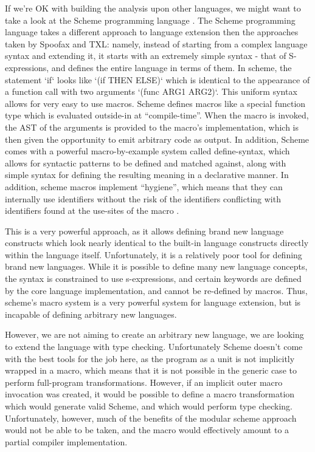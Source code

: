 If we’re OK with building the analysis upon other languages, we might want to
take a look at the Scheme programming language \cite{schemebook}. The Scheme
programming language takes a different approach to language extension then the
approaches taken by Spoofax and TXL: namely, instead of starting from a complex
language syntax and extending it, it starts with an extremely simple syntax -
that of S-expressions, and defines the entire language in terms of them. In
scheme, the statement `if` looks like `(if THEN ELSE)` which is identical to the
appearance of a function call with two arguments `(func ARG1 ARG2)`. This
uniform syntax allows for very easy to use macros. Scheme defines macros like a
special function type which is evaluated outside-in at “compile-time”. When the
macro is invoked, the AST of the arguments is provided to the macro’s
implementation, which is then given the opportunity to emit arbitrary code as
output. In addition, Scheme comes with a powerful macro-by-example system called
define-syntax, which allows for syntactic patterns to be defined and matched
against, along with simple syntax for defining the resulting meaning in a
declarative manner. In addition, scheme macros implement “hygiene”, which means
that they can internally use identifiers without the risk of the identifiers
conflicting with identifiers found at the use-sites of the
macro \cite{schemesyntaxpaper}.

This is a very powerful approach, as it allows defining brand new language
constructs which look nearly identical to the built-in language constructs
directly within the language itself. Unfortunately, it is a relatively poor tool
for defining brand new languages. While it is possible to define many new
language concepts, the syntax is constrained to use s-expressions, and certain
keywords are defined by the core language implementation, and cannot be
re-defined by macros. Thus, scheme’s macro system is a very powerful system for
language extension, but is incapable of defining arbitrary new languages.

However, we are not aiming to create an arbitrary new language, we are looking
to extend the language with type checking. Unfortunately Scheme doesn’t come
with the best tools for the job here, as the program as a unit is not implicitly
wrapped in a macro, which means that it is not possible in the generic case to
perform full-program transformations. However, if an implicit outer macro
invocation was created, it would be possible to define a macro transformation
which would generate valid Scheme, and which would perform type checking.
Unfortunately, however, much of the benefits of the modular scheme approach
would not be able to be taken, and the macro would effectively amount to a
partial compiler implementation.

